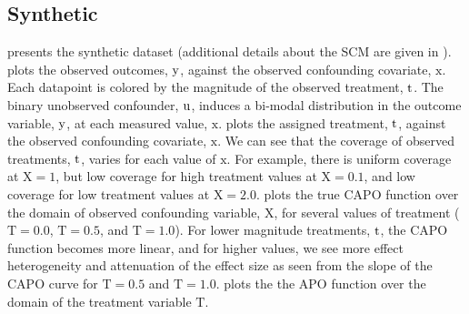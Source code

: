 \subsection{Synthetic}
 presents the synthetic dataset (additional details about the SCM are given in ).
 plots the observed outcomes, $\mathrm{y}$, against the observed confounding covariate, $\mathrm{x}$.
Each datapoint is colored by the magnitude of the observed treatment, $\mathrm{t}$.
The binary unobserved confounder, $\mathrm{u}$, induces a bi-modal distribution in the outcome variable, $\mathrm{y}$, at each measured value, $\mathrm{x}$.
 plots the assigned treatment, $\mathrm{t}$, against the observed confounding covariate, $\mathrm{x}$.
We can see that the coverage of observed treatments, $\mathrm{t}$, varies for each value of $\mathrm{x}$.
For example, there is uniform coverage at $\mathrm{X}=1$, but low coverage for high treatment values at $\mathrm{X}=0.1$, and low coverage for low treatment values at $\mathrm{X}=2.0$.
 plots the true CAPO function over the domain of observed confounding variable, $\mathrm{X}$, for several values of treatment ($\mathrm{T}=0.0$, $\mathrm{T}=0.5$, and $\mathrm{T}=1.0$).
For lower magnitude treatments, $\mathrm{t}$, the CAPO function becomes more linear, and for higher values, we see more effect heterogeneity and attenuation of the effect size as seen from the slope of the CAPO curve for $\mathrm{T}=0.5$ and $\mathrm{T}=1.0$.
 plots the the APO function over the domain of the treatment variable $\mathrm{T}$.

